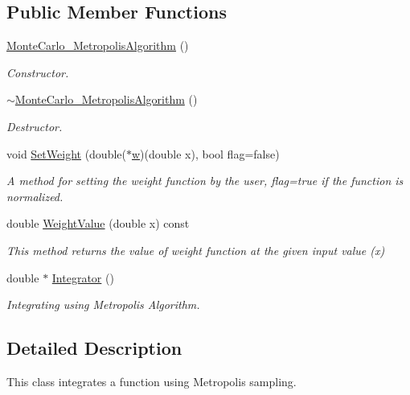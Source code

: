 \subsection*{Public Member Functions}
\begin{DoxyCompactItemize}
\item 
\hyperlink{class_monte_carlo___metropolis_algorithm_a80995ad029b056ca675c751c247426a5}{Monte\+Carlo\+\_\+\+Metropolis\+Algorithm} ()
\begin{DoxyCompactList}\small\item\em Constructor. \end{DoxyCompactList}\item 
\hyperlink{class_monte_carlo___metropolis_algorithm_aecedd40f8c0098bc66d455ef06814981}{$\sim$\+Monte\+Carlo\+\_\+\+Metropolis\+Algorithm} ()
\begin{DoxyCompactList}\small\item\em Destructor. \end{DoxyCompactList}\item 
void \hyperlink{class_monte_carlo___metropolis_algorithm_adcbfbdb6058a0a6de2f8b18698834a91}{Set\+Weight} (double($\ast$\hyperlink{main_8cpp_a6f95c347c46d0a26fc68408b470a98df}{w})(double x), bool flag=false)
\begin{DoxyCompactList}\small\item\em A method for setting the weight function by the user, flag=true if the function is normalized. \end{DoxyCompactList}\item 
double \hyperlink{class_monte_carlo___metropolis_algorithm_a5295f6e5691292d833da48105b13ece4}{Weight\+Value} (double x) const
\begin{DoxyCompactList}\small\item\em This method returns the value of weight function at the given input value (x) \end{DoxyCompactList}\item 
double $\ast$ \hyperlink{class_monte_carlo___metropolis_algorithm_a93fba72a50330bf184156e23158992b2}{Integrator} ()
\begin{DoxyCompactList}\small\item\em Integrating using Metropolis Algorithm. \end{DoxyCompactList}\end{DoxyCompactItemize}


\subsection{Detailed Description}
This class integrates a function using Metropolis sampling. 

